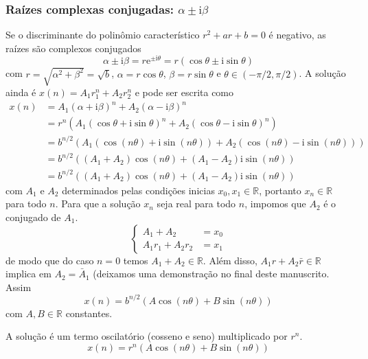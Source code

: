 \documentclass{article}
\begin{document}
\subsubsection{Raízes complexas conjugadas: $\alpha \pm\mathrm{ i }\beta $}
Se o discriminante do polinômio característico \( r^2 + a r + b = 0 \)
é negativo, as raízes são complexos conjugados
\[
  \alpha \pm \mathrm{i} \beta
  =
  r  \mathrm{e}^{\pm \mathrm{i}\theta}
  =
  r(\cos \theta \pm \mathrm{i} \sin\theta)
\]
com $r= \sqrt{\alpha^2+\beta^2} =\sqrt{b}$, $\alpha=r\cos \theta$,
$\beta=r\sin\theta$ e $\theta \in(-\pi/2,\pi/2)$.  A solução ainda é
\( x(n) = A_1 r_1^n + A_2 r_2^n \) e pode ser escrita como
\[
  \begin{aligned}
    x(n) & = A_1 (\alpha + \mathrm{i} \beta)^n +  A_2 (\alpha - \mathrm{i} \beta)^n  \\
     & = r^n \left(  A_1 (\cos \theta + \mathrm{i} \sin\theta)^n +  A_2 (\cos \theta - \mathrm{i} \sin\theta)^n\right)  \\
     & = b^{n/2} \left(  A_1 (\cos (n\theta) + \mathrm{i} \sin(n\theta)) +  A_2 (\cos(n \theta) - \mathrm{i} \sin(n\theta))\right)  \\
     & = b^{n/2} \left(  (A_1+A_2)\cos (n\theta) + (A_1-A_2) \mathrm{i} \sin(n\theta) \right)  \\
     & = b^{n/2} \left(  (A_1 + A_2)\cos (n\theta) + (A_1-A_2) \mathrm{i} \sin(n\theta) \right) 
  \end{aligned}
\]
com $A_1$ e $A_2$ determinados pelas condições inicias
$x_0, x_1 \in\mathbb R$, portanto $x_n\in\mathbb R$ para todo $n$. Para
que a solução $x_n$ seja real para todo $n$, impomos que $A_2$ é o
conjugado de $A_1$.
\begin{equation*}
  \begin{cases}
    A_1 +A_2 &= x_0 \\
    A_1r_1 +A_2r_2 &= x_1 
  \end{cases}
\end{equation*}
de modo que do caso $n=0$ temos $A_1+A_2 \in\mathbb R$. Além disso,
$A_1r +A_2 \bar r \in \mathbb R$ implica em $A_2 = \bar A_1$ (deixamos
uma demonstração no final deste manuscrito. Assim
\[
  x(n) =  b^{n/2} \left(  A \cos (n\theta) + B \sin(n\theta) \right) 
\]
com $A,B\in\mathbb R$ constantes.


A solução é um termo oscilatório (cosseno e seno) multiplicado por $r^n$.
\begin{equation*}
x(n) = r^n \left( A \cos(n\theta) + B \sin(n\theta) \right)
\end{equation*}
\end{document}
